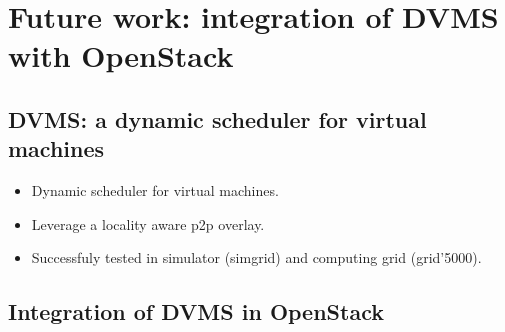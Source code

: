 \section{Future work: integration of DVMS with OpenStack}
\label{sec:future_work}

\subsection{DVMS: a dynamic scheduler for virtual machines}

\begin{itemize}

	\item Dynamic scheduler for virtual machines.

	\item Leverage a locality aware p2p overlay.

	\item Successfuly tested in simulator (simgrid) and computing grid (grid'5000).

\end{itemize}


\subsection{Integration of DVMS in OpenStack}

